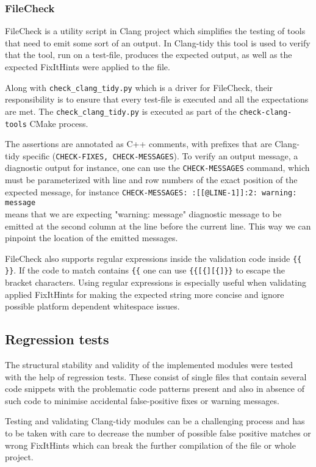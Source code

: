 \subsubsection{FileCheck}
\par FileCheck is a utility script in Clang project which simplifies the testing of tools that need to emit some sort of an output\cite{filecheck_docs}. In Clang-tidy this tool is used to verify that the tool, run on a test-file, produces the expected output, as well as the expected FixItHints were applied to the file. \medskip
\par Along with \verb|check_clang_tidy.py| which is a driver for FileCheck, their responsibility is to ensure that every test-file is executed and all the expectations are met. The \verb|check_clang_tidy.py| is executed as part of the \verb|check-clang-tools| CMake process. \medskip
\par The assertions are annotated as C++ comments, with prefixes that are Clang-tidy specific (\verb|CHECK-FIXES, CHECK-MESSAGES|). To verify an output message, a diagnostic output for instance, one can use the \verb|CHECK-MESSAGES| command, which must be parameterized with line and row numbers of the exact position of the expected message, for instance \verb|CHECK-MESSAGES: :[[@LINE-1]]:2: warning: message|\\ means that we are expecting "warning: message" diagnostic message to be emitted at the second column at the line before the current line. This way we can pinpoint the location of the emitted messages. \medskip
\par FileCheck also supports regular expressions inside the validation code inside \verb|{{ }}|. If the code to match contains \verb|{{| one can use \verb|{{[{][{]}}| to escape the bracket characters. Using regular expressions is especially useful when validating applied FixItHints for making the expected string more concise and ignore possible platform dependent whitespace issues.
\subsection{Regression tests}
\par The structural stability and validity of the implemented modules were tested with the help of regression tests. These consist of single files that contain several code snippets with the problematic code patterns present and also in absence of such code to minimise accidental false-positive fixes or warning messages.
\par Testing and validating Clang-tidy modules can be a challenging process and has to be taken with care to decrease the number of possible false positive matches or wrong FixItHints which can break the further compilation of the file or whole project. 
